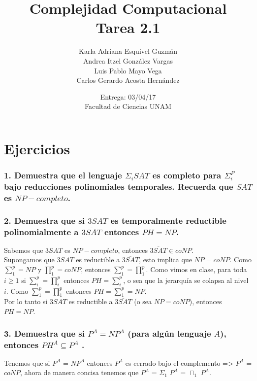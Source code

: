 \documentclass[12pt]{article}
\title{Complejidad Computacional \\ Tarea 2.1}
\author{Karla Adriana Esquivel Guzmán \\ Andrea Itzel González Vargas\\ Luis Pablo Mayo Vega \\ Carlos Gerardo Acosta Hernández}
\date{Entrega: 03/04/17 \\ Facultad de Ciencias UNAM}
\begin{document}
\maketitle
\section*{Ejercicios}
\subsubsection*{1. Demuestra que el lenguaje $\Sigma_iSAT$ es completo para $\Sigma^P_i$ bajo reducciones polinomiales
temporales. Recuerda que $SAT$ es $NP-completo$.}
\subsubsection*{2. Demuestra que si $3SAT$ es temporalmente reductible polinomialmente a $\overline{3SAT}$ entonces $PH = NP$.}
Sabemos que $3SAT$ es $NP-completo$, entonces $\overline{3SAT} \in coNP$. \\
Supongamos que $3SAT$ es reductible a $\overline{3SAT}$, esto implica que $NP = coNP$. Como $\sum_1^p = NP$ y $\prod_1^p = coNP$, entonces $\sum_1^p = \prod_1^p$. Como vimos en clase, para toda $i \geq 1$ si $\sum_i^p = \prod_i^p$ entonces $PH = \sum_i^p$, o sea que la jerarquía se colapsa al nivel $i$. Como $\sum_1^p = \prod_1^p$ entonces $PH = \sum_1^p = NP$. \\
Por lo tanto si $3SAT$ es reductible a $\overline{3SAT}$ (o sea $NP = coNP$), entonces $PH = NP$.

\subsubsection*{3. Demuestra que si $P^A = NP^A$ (para algún lenguaje $A$), entonces $PH^A \subseteq P^A$ .}
Tenemos que si $P^A$ = $NP^A$ entonces $P^A$ es cerrado bajo el complemento => $P^A$ = $coNP$, ahora de manera concisa tenemos que
$P^A$ = $\Sigma_{1}$ $P^A$ = $\sqcap_{1}$ $P^A$. \\
\end{document}
